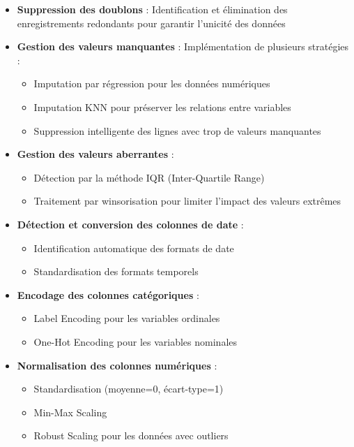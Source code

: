 \begin{itemize}
    \item \textbf{Suppression des doublons} : Identification et élimination des enregistrements redondants pour garantir l'unicité des données
    \item \textbf{Gestion des valeurs manquantes} : Implémentation de plusieurs stratégies :
    \begin{itemize}
        \item Imputation par régression pour les données numériques
        \item Imputation KNN pour préserver les relations entre variables
        \item Suppression intelligente des lignes avec trop de valeurs manquantes
    \end{itemize}
    \item \textbf{Gestion des valeurs aberrantes} :
    \begin{itemize}
        \item Détection par la méthode IQR (Inter-Quartile Range)
        \item Traitement par winsorisation pour limiter l'impact des valeurs extrêmes
    \end{itemize}
    \item \textbf{Détection et conversion des colonnes de date} :
    \begin{itemize}
        \item Identification automatique des formats de date
        \item Standardisation des formats temporels
    \end{itemize}
    \item \textbf{Encodage des colonnes catégoriques} :
    \begin{itemize}
        \item Label Encoding pour les variables ordinales
        \item One-Hot Encoding pour les variables nominales
    \end{itemize}
    \item \textbf{Normalisation des colonnes numériques} :
    \begin{itemize}
        \item Standardisation (moyenne=0, écart-type=1)
        \item Min-Max Scaling
        \item Robust Scaling pour les données avec outliers
    \end{itemize}
\end{itemize}

